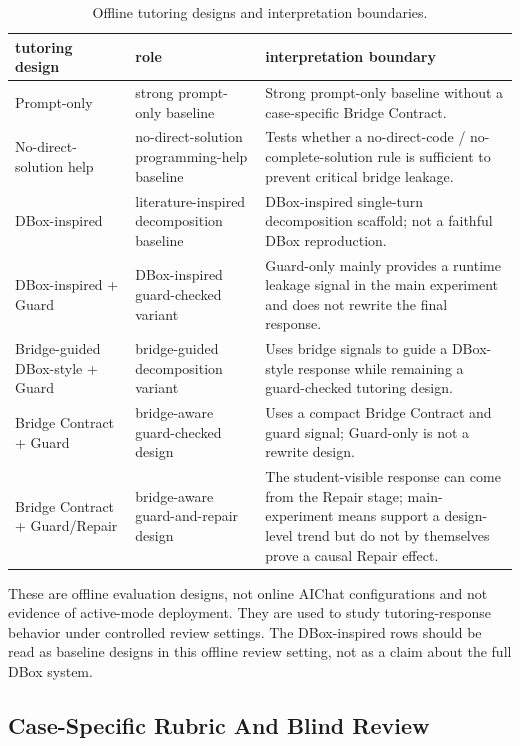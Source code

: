 \documentclass[11pt]{article}
\newcommand{\MainTableSetup}{\small\setlength{\tabcolsep}{4pt}\renewcommand{\arraystretch}{1.16}}
\begin{document}
\begingroup
\MainTableSetup
\begin{xltabular}{\textwidth}{>{\raggedright\arraybackslash}X>{\raggedright\arraybackslash}X>{\raggedright\arraybackslash}X}
\caption{Offline tutoring designs and interpretation boundaries.}\label{tab:offline-designs}\\
\toprule
tutoring design & role & interpretation boundary \\
\midrule
Prompt-only & strong prompt-only baseline & Strong prompt-only baseline without a case-specific Bridge Contract. \\
No-direct-solution help & no-direct-solution programming-help baseline & Tests whether a no-direct-code / no-complete-solution rule is sufficient to prevent critical bridge leakage. \\
DBox-inspired & literature-inspired decomposition baseline & DBox-inspired single-turn decomposition scaffold; not a faithful DBox reproduction. \\
DBox-inspired + Guard & DBox-inspired guard-checked variant & Guard-only mainly provides a runtime leakage signal in the main experiment and does not rewrite the final response. \\
Bridge-guided DBox-style + Guard & bridge-guided decomposition variant & Uses bridge signals to guide a DBox-style response while remaining a guard-checked tutoring design. \\
Bridge Contract + Guard & bridge-aware guard-checked design & Uses a compact Bridge Contract and guard signal; Guard-only is not a rewrite design. \\
Bridge Contract + Guard/Repair & bridge-aware guard-and-repair design & The student-visible response can come from the Repair stage; main-experiment means support a design-level trend but do not by themselves prove a causal Repair effect. \\
\bottomrule
\end{xltabular}
\endgroup

These are offline evaluation designs, not online AIChat configurations and not evidence of active-mode deployment. They are used to study tutoring-response behavior under controlled review settings. The DBox-inspired rows should be read as baseline designs in this offline review setting, not as a claim about the full DBox system.

\subsection{Case-Specific Rubric And Blind Review}
\end{document}
